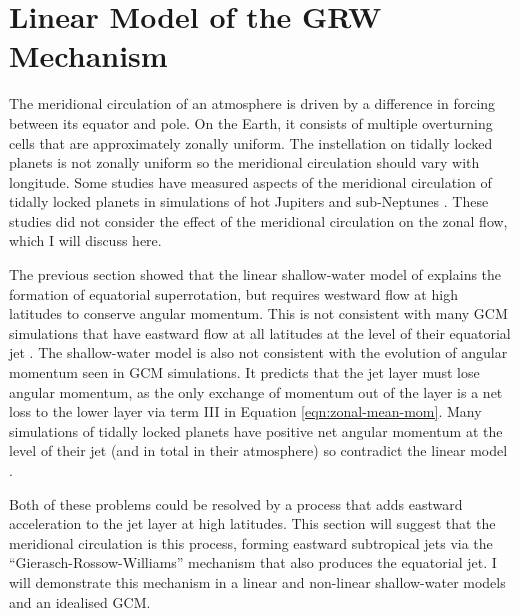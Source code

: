 \section{Linear Model of the GRW Mechanism}

The meridional circulation of an atmosphere is driven by a difference in forcing between its equator and pole. On the Earth, it consists of multiple overturning cells that are approximately zonally uniform. The instellation on tidally locked planets is not zonally uniform so the meridional circulation should vary with longitude. Some studies have measured aspects of the meridional circulation of tidally locked planets in simulations of hot Jupiters and sub-Neptunes \citep{charnay20153d, showman2015circulation, mendoncca2018revisiting}. These studies did not consider the effect of the meridional circulation on the zonal flow, which I will discuss here.

The previous section showed that the linear shallow-water model of \citet{showman2010superrotation} explains the formation of equatorial superrotation, but requires westward flow at high latitudes to conserve angular momentum. This is not consistent with many GCM simulations that have eastward flow at all latitudes at the level of their equatorial jet \citep{kataria2015atmospheric,showman2015circulation,pierrehumbert2018review}. The shallow-water model is also not consistent with the evolution of angular momentum seen in GCM simulations. It predicts that the jet layer must lose angular momentum, as the only exchange of momentum out of the layer is a net loss to the lower layer via term III in Equation \ref{eqn:zonal-mean-mom}. Many simulations of tidally locked planets have positive net angular momentum at the level of their jet (and in total in their atmosphere) so contradict the linear model \citep{heng2015review, pierrehumbert2018review}.

Both of these problems could be resolved by a process that adds eastward acceleration to the jet layer at high latitudes. This section will suggest that the meridional circulation is this process, forming eastward subtropical jets via the ``Gierasch-Rossow-Williams'' mechanism that also produces the equatorial jet. I will demonstrate this mechanism in a linear and non-linear shallow-water models and an idealised GCM.




